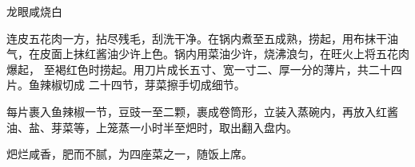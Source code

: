 %
%
%
%
%
%
%
\begin{recipe}{龙眼咸烧白}

\ingredients


\preparation

\step 连皮五花肉一方，拈尽残毛，刮洗干净。在锅内煮至五成熟，捞起，用布抹干油
气，在皮面上抹红酱油少许上色。锅内用菜油少许，烧沸浪匀，在旺火上将五花肉爆起，
至褐红色时捞起。用刀片成长五寸、宽一寸二、厚一分的薄片，共二十四片。鱼辣椒切成
二十四节，芽菜擦手切成细节。

\step 每片裹入鱼辣椒一节，豆豉一至二颗，裹成卷筒形，立装入蒸碗内，再放入红酱
油、盐、芽菜等，上笼蒸一小时半至𤆵时，取出翻入盘内。

\features

𤆵烂咸香，肥而不腻，为四座菜之一，随饭上席。

\end{recipe}

